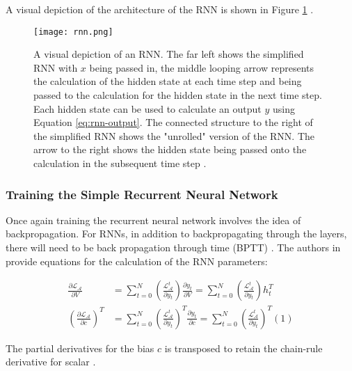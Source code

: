A visual depiction of the architecture of the RNN is shown in Figure \ref{fig:rnn} \cite{CS231nConvolutionalNeural}.

\begin{figure}[ht]
    \centering
    \texttt{[image: rnn.png]}
    \caption{A visual depiction of an RNN. The far left shows the simplified RNN with $x$ being passed in, the middle looping arrow represents the calculation of the hidden state at each time step and being passed to the calculation for the hidden state in the next time step. Each hidden state can be used to calculate an output $y$ using Equation \ref{eq:rnn-output}. The connected structure to the right of the simplified RNN shows the "unrolled" version of the RNN. The arrow to the right shows the hidden state being passed onto the calculation in the subsequent time step \cite{CS231nConvolutionalNeural}.}
    \label{fig:rnn}
\end{figure}


\subsubsection{Training the Simple Recurrent Neural Network}
Once again training the recurrent neural network involves the idea of backpropagation. For RNNs, in addition to backpropagating through the layers, there will need to be back propagation through time (BPTT) \cite{salemRecurrentNeuralNetworks2022}. The authors in \cite{salemRecurrentNeuralNetworks2022} provide equations for the calculation of the RNN parameters:

\begin{equation}
    \begin{split}
        \frac{\partial \mathcal{L}_\mathcal{A}}{\partial V} &= \sum_{t=0}^{N}\left(\frac{\mathcal{L}_\mathcal{A}^t}{\partial y_t}\right) \frac{\partial y_t}{\partial V} = \sum_{t=0}^{N}\left(\frac{\mathcal{L}_\mathcal{A}^t}{\partial y_t}\right) h_t^T \\
        \left(\frac{\partial \mathcal{L}_\mathcal{A}}{\partial c}\right)^T &= \sum_{t=0}^{N}\left(\frac{\mathcal{L}_\mathcal{A}^t}{\partial y_t}\right)^T \frac{\partial y_t}{\partial c} = \sum_{t=0}^{N}\left(\frac{\mathcal{L}_\mathcal{A}^t}{\partial y_t}\right)^T (1)
    \end{split}
\end{equation}

The partial derivatives for the bias $c$ is transposed to retain the chain-rule derivative for scalar \cite{salemRecurrentNeuralNetworks2022}. 

